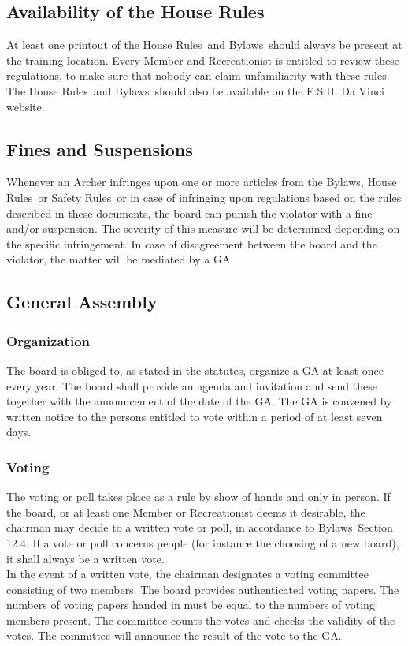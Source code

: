 \documentclass[a4paper]{article}
\newcommand{\Asta}{Bylaws} %
\newcommand{\Ahr}{House Rules} %
\newcommand{\Asr}{Safety Rules} %
\begin{document}
\subsection{Availability of the \Ahr}
At least one printout of the \Ahr\ and \Asta\ should always be present at the training location. Every Member and Recreationist is entitled to review these regulations, to make sure that nobody can claim unfamiliarity with these rules. The \Ahr\ and \Asta\ should also be available on the E.S.H. Da Vinci website.

\subsection{Fines and Suspensions}
Whenever an Archer infringes upon one or more articles from the \Asta , \Ahr\ or \Asr\, or in case of infringing upon regulations based on the rules described in these documents, the board can punish the violator with a fine and/or suspension. The severity of this measure will be determined depending on the specific infringement. In case of disagreement between the board and the violator, the matter will be mediated by a GA.

\subsection{General Assembly}
\subsubsection{Organization}
The board is obliged to, as stated in the statutes, organize a GA at least once every year.  The board shall provide an agenda and invitation and send these together with the announcement of the date of the GA. The GA is convened by written notice to the persons entitled to vote within a period of at least seven days.  

\subsubsection{Voting}
The voting or poll takes place as a rule by show of hands and only in person. If the board, or at least one Member or Recreationist deems it desirable, the chairman may decide to a written vote or poll, in accordance to \Asta\ Section 12.4. If a vote or poll concerns people (for instance the choosing of a new board), it shall always be a written vote. \\ 

In the event of a written vote, the chairman designates a voting committee consisting of two members. The board provides authenticated voting papers. The numbers of voting papers handed in must be equal to the numbers of voting members present. The committee counts the votes and checks the validity of the votes. The committee will announce the result of the vote to the GA. \\
\end{document}
